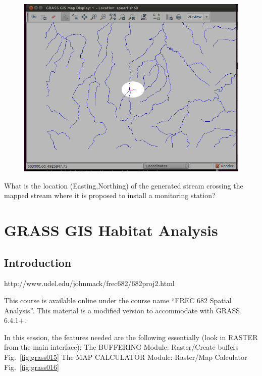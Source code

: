 \begin{figure}[htbp]
   \centering
   \includegraphics[scale=0.35]{grass014.png}
   \caption{}
   \label{fig:grass014}
\end{figure}

What is the location (Easting,Northing) of the generated stream crossing
the mapped stream where it is proposed to install a monitoring
station?

\section{GRASS GIS Habitat Analysis}
\subsection{Introduction}

http://www.udel.edu/johnmack/frec682/682proj2.html

This course is available online under the course name ``FREC 682 Spatial Analysis''. This material is a modified version to accommodate with GRASS 6.4.1+.

In this session, the features needed are the following essentially (look in RASTER from the main interface):
The BUFFERING Module:   Raster/Create buffers Fig.~\ref{fig:grass015}
The MAP CALCULATOR Module:   Raster/Map Calculator Fig.~\ref{fig:grass016}

